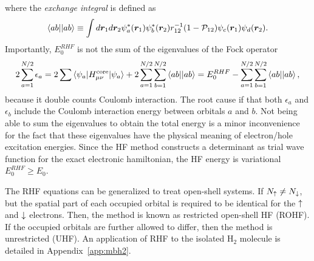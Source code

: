 where the \textit{exchange integral} is defined as
\begin{align}
\braket{ab||ab} \equiv \int d\boldsymbol{r}_1d\boldsymbol{r}_2 \psi_a^*(\boldsymbol{r}_1)\psi_b^*(\boldsymbol{r}_2)r_{12}^{-1}(1-\mathcal{P}_{12})\psi_c(\boldsymbol{r}_1)\psi_d(\boldsymbol{r}_2).
\end{align}
Importantly, $E^{RHF}_0$ is not the sum of the eigenvalues of the Fock operator
\begin{align} \label{eq:hf-esum}
2\sum\limits_{a=1}^{N/2} \epsilon_a = 2\sum\limits\braket{\psi_a|H^{\text{core}}_{\mu\nu}|\psi_a} + 2\sum\limits_{a=1}^{N/2}\sum\limits_{b=1}^{N/2} \braket{ab||ab} = E^{RHF}_0-\sum\limits_{a=1}^{N/2}\sum\limits_{b=1}^{N/2} \braket{ab||ab},
\end{align}
because it double counts Coulomb interaction. The root cause if that both $\epsilon_a$ and $\epsilon_b$ include the Coulomb interaction energy between orbitals $a$ and $b$.
Not being able to sum the eigenvalues to obtain the total energy is a minor inconvenience for the fact that these eigenvalues have the physical meaning of electron/hole excitation energies.
Since the HF method constructs a determinant as trial wave function for the exact electronic hamiltonian, the HF energy is variational $E^{RHF}_0 \ge E_0$.

The RHF equations can be generalized to treat open-shell systems.
If $N_{\uparrow} \neq N_{\downarrow}$, but the spatial part of each occupied orbital is required to be identical for the $\uparrow$ and $\downarrow$ electrons. Then, the method is known as restricted open-shell HF (ROHF).
If the occupied orbitals are further allowed to differ, then the method is unrestricted (UHF).
An application of RHF to the isolated H$_2$ molecule is detailed in Appendix~\ref{app:mbh2}.

